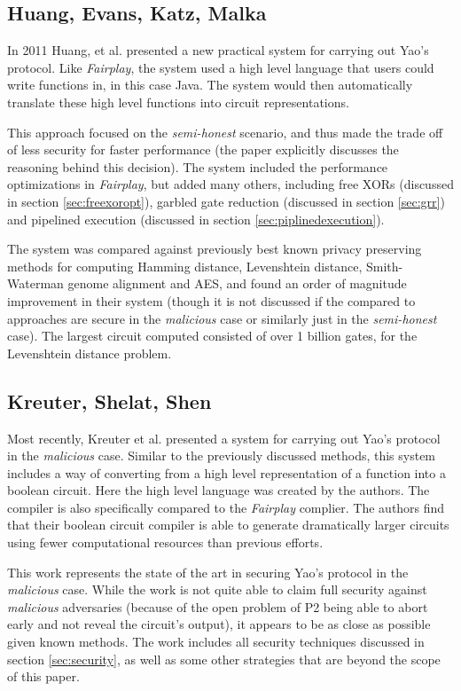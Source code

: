 \subsection{Huang, Evans, Katz, Malka}

In 2011 Huang, et al.\cite{huang2011faster} presented a new practical system for carrying out Yao's protocol.  Like \emph{Fairplay}, the system used a high level language that users could write functions in, in this case Java.  The system would then automatically translate these high level functions into circuit representations.

This approach focused on the \emph{semi-honest} scenario, and thus made the trade off of less security for faster performance (the paper explicitly discusses the reasoning behind this decision). The system included the performance optimizations in \emph{Fairplay}, but added many others, including free XORs (discussed in section \ref{sec:freexoropt}), garbled gate reduction (discussed in section \ref{sec:grr}) and pipelined execution (discussed in section \ref{sec:piplinedexecution}).

The system was compared against previously best known privacy preserving methods for computing Hamming distance, Levenshtein distance, Smith-Waterman genome alignment and AES, and found an order of magnitude improvement in their system (though it is not discussed if the compared to approaches are secure in the \emph{malicious} case or similarly just in the \emph{semi-honest} case). The largest circuit computed consisted of over 1 billion gates, for the Levenshtein distance problem.

\pagebreak
\subsection{Kreuter, Shelat, Shen}

Most recently, Kreuter et al.\cite{kreuter2012billion} presented a system for carrying out Yao's protocol in the \emph{malicious} case.  Similar to the previously discussed methods, this system includes a way of converting from a high level representation of a function into a boolean circuit.  Here the high level language was created by the authors.  The compiler is also specifically compared to the \emph{Fairplay} complier.  The authors find that their boolean circuit compiler is able to generate dramatically larger circuits using fewer computational resources than previous efforts.

This work represents the state of the art in securing Yao's protocol in the \emph{malicious} case.  While the work is not quite able to claim full security against \emph{malicious} adversaries (because of the open problem of \ac{P2} being able to abort early and not reveal the circuit's output), it appears to be as close as possible given known methods.  The work includes all security techniques discussed in section \ref{sec:security}, as well as some other strategies that are beyond the scope of this paper.

